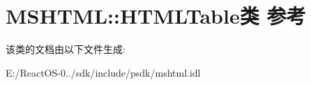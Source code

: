 \hypertarget{class_m_s_h_t_m_l_1_1_h_t_m_l_table}{}\section{M\+S\+H\+T\+ML\+:\+:H\+T\+M\+L\+Table类 参考}
\label{class_m_s_h_t_m_l_1_1_h_t_m_l_table}


该类的文档由以下文件生成\+:\begin{DoxyCompactItemize}
\item 
E\+:/\+React\+O\+S-\/0../sdk/include/psdk/mshtml.\+idl\end{DoxyCompactItemize}
